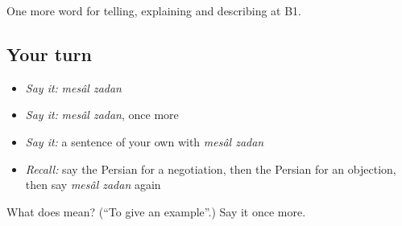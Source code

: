 \begin{grammarlens}[title={What you've built}]
One more word for telling, explaining and describing at B1.
\end{grammarlens}

\subsection*{Your turn}
\begin{itemize}
\raggedright
  \item \emph{Say it:} \emph{mesâl zadan}
  \item \emph{Say it:} \emph{mesâl zadan}, once more
  \item \emph{Say it:} a sentence of your own with \emph{mesâl zadan}
  \item \emph{Recall:} say the Persian for a negotiation, then the Persian for an objection, then say \emph{mesâl zadan} again
\end{itemize}

\begin{tcolorbox}[breakable,colback=teal!4,colframe=teal!35!black,title={Before you move on}]
What does   mean? (\textquotedblleft{}To give an example\textquotedblright{}.) Say it once more.
\end{tcolorbox}
